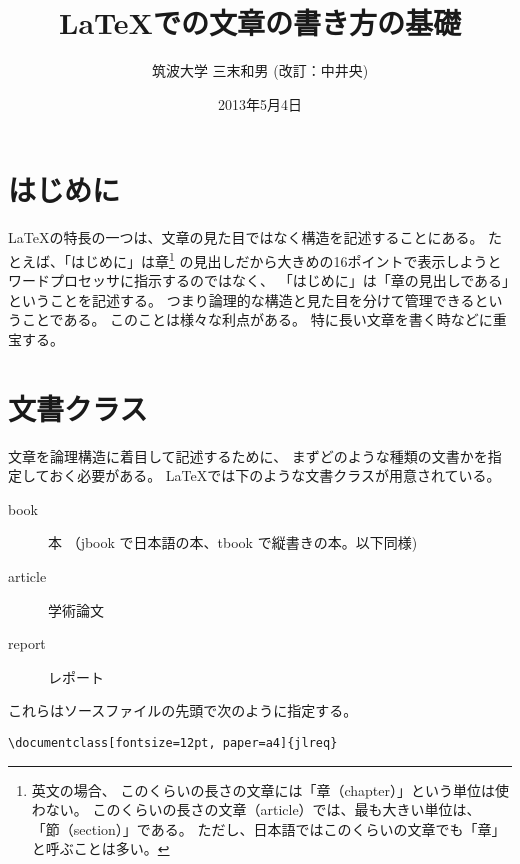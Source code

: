 \documentclass[fontsize=12pt, paper=a4]{jlreq}
\title{\LaTeX での文章の書き方の基礎}
\author{筑波大学 三末和男 (改訂：中井央)}
\date{2013年5月4日}
\begin{document}
\maketitle



\section{はじめに}


\LaTeX の特長の一つは、文章の見た目ではなく構造を記述することにある。
たとえば、「はじめに」は章\footnote{英文の場合、
  このくらいの長さの文章には「章（chapter）」という単位は使わない。
  このくらいの長さの文章（article）では、最も大きい単位は、
  「節（section）」である。
  ただし、日本語ではこのくらいの文章でも「章」と呼ぶことは多い。
}
の見出しだから大きめの16ポイントで表示しようと
ワードプロセッサに指示するのではなく、
「はじめに」は「章の見出しである」ということを記述する。
つまり論理的な構造と見た目を分けて管理できるということである。
このことは様々な利点がある。
特に長い文章を書く時などに重宝する。

\section{文書クラス}\label{sec:documentclass}

文章を論理構造に着目して記述するために、
まずどのような種類の文書かを指定しておく必要がある。
\LaTeX では下のような文書クラスが用意されている。

\begin{description}
\item[book] 本 （jbook で日本語の本、tbook で縦書きの本。以下同様)
\item[article] 学術論文
\item[report] レポート
\end{description}


これらはソースファイルの先頭で次のように指定する。

{\small
\begin{verbatim}
\documentclass[fontsize=12pt, paper=a4]{jlreq}
\end{verbatim}
}
\end{document}
